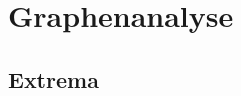 \documentclass[%
11pt,%
twoside,%
titlepage,%
german,%
headsepline%
]{scrartcl}
\begin{document}

\clearpage

\section{Graphenanalyse}

\subsection{Extrema}
\end{document}
